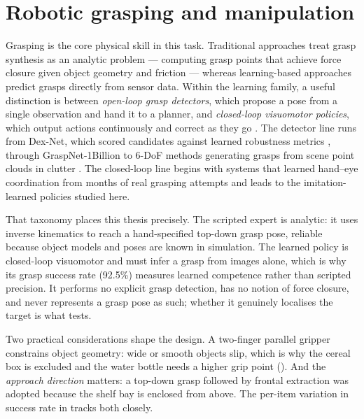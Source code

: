\section{Robotic grasping and manipulation}
\label{sec:bg-grasp}
Grasping is the core physical skill in this task. Traditional approaches treat grasp
synthesis as an analytic problem --- computing grasp points that achieve force closure
given object geometry and friction \parencite{bicchi2000grasping} --- whereas
learning-based approaches predict grasps directly from sensor data. Within the learning
family, a useful distinction is between \emph{open-loop grasp detectors}, which propose
a pose from a single observation and hand it to a planner, and \emph{closed-loop
visuomotor policies}, which output actions continuously and correct as they go
\parencite{newbury2023graspreview}. The detector line runs from Dex-Net, which scored
candidates against learned robustness metrics \parencite{mahler2017dexnet}, through
GraspNet-1Billion \parencite{fang2020graspnet} to 6-DoF methods generating grasps from
scene point clouds in clutter \parencite{sundermeyer2021contactgraspnet}. The
closed-loop line begins with systems that learned hand--eye coordination from months of
real grasping attempts \parencite{levine2018handeye} and leads to the imitation-learned
policies studied here.

That taxonomy places this thesis precisely. The scripted expert is analytic: it uses
inverse kinematics to reach a hand-specified top-down grasp pose, reliable because
object models and poses are known in simulation. The learned policy is closed-loop
visuomotor and must infer a grasp from images alone, which is why its grasp success rate
(92.5\%) measures learned competence rather than scripted precision. It performs no
explicit grasp detection, has no notion of force closure, and never represents a grasp
pose as such; whether it genuinely localises the target is what
 tests.

Two practical considerations shape the design. A two-finger parallel gripper constrains
object geometry: wide or smooth objects slip, which is why the cereal box is excluded
and the water bottle needs a higher grip point (). And the
\emph{approach direction} matters: a top-down grasp followed by frontal extraction was
adopted because the shelf bay is enclosed from above. The per-item variation in success
rate in  tracks both closely.

